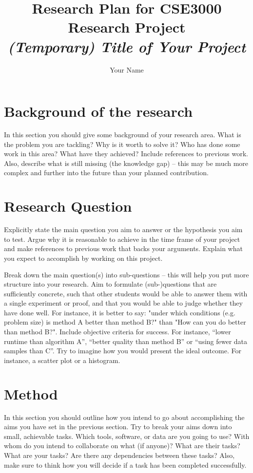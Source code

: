 \documentclass[english, a4paper]{article}
\title{
    Research Plan for CSE3000 Research Project\\
    {\Large \textit{(Temporary) Title of Your Project}}
}
\author{Your Name}
\begin{document}
\maketitle


\section*{Background of the research}
In this section you should give some background of your research area. What is the problem you are tackling? Why is it worth to solve it? Who has done some work in this area? What have they achieved? Include references to previous work. Also, describe what is still missing (the knowledge gap) -- this may be much more complex and further into the future than your planned contribution.


\section*{Research Question}
Explicitly state the main question you aim to answer or the hypothesis you aim to test. Argue why it is reasonable to achieve in the time frame of your project and make references to previous work that backs your arguments. Explain what you expect to accomplish by working on this project.  

Break down the main question(s) into sub-questions -- this will help you put more structure into your research. Aim to formulate (sub-)questions that are sufficiently concrete, such that other students would be able to answer them with a single experiment or proof, and that you would be able to judge whether they have done well. For instance, it is better to say: "under which conditions (e.g. problem size) is method A better than method B?" than "How can you do better than method B?". Include objective criteria for success. For instance, ``lower runtime than algorithm A'', ``better quality than method B'' or ``using fewer data samples than C''. Try to imagine how you would present the ideal outcome. For instance, a scatter plot or a histogram.

\section*{Method}
In this section you should outline how you intend to go
about accomplishing the aims you have set in the previous
section. Try to break your aims down into small, achievable tasks. 
Which tools, software, or data are you going to use? With whom do you intend to collaborate on what (if anyone)? What are their tasks? What are your tasks? Are there any dependencies between these tasks? Also, make sure to think how you will decide if a task has been completed successfully.
\end{document}
